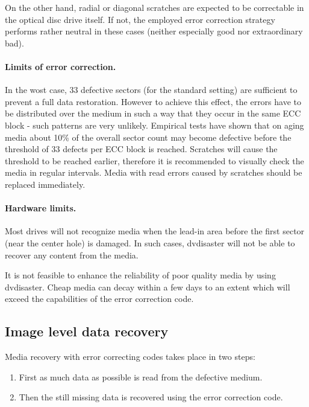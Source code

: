 On the other hand, radial or diagonal scratches are expected to be correctable 
in the optical disc drive itself. If not, the employed error correction 
strategy performs rather neutral in these cases (neither especially good 
nor extraordinary bad).

\paragraph{Limits of error correction.} In the wost case, 33 defective sectors (for the
standard setting) are sufficient to prevent a full data restoration. However 
to achieve this effect, the errors have to be distributed over the medium in such 
a way that they occur in the same ECC block - such patterns are very unlikely.
Empirical tests have shown that on aging media about 10\% of the overall 
sector count may become defective before the threshold of 33 defects per ECC block is reached.
Scratches will cause the threshold to be reached earlier, therefore it is 
recommended to visually check the media in regular intervals. Media with read errors 
caused by scratches should be replaced immediately.

\paragraph{Hardware limits.}  Most drives will not recognize media when the 
lead-in area before the first sector (near the center hole) is damaged. 
In such cases, dvdisaster will not be able to recover any content from the media.

It is not feasible to enhance the reliability of poor quality media by using 
dvdisaster. Cheap media can decay within a few days to an extent which will 
exceed the capabilities of the error correction code. 

\subsection{Image level data recovery}
\label{background-image-level}

Media recovery with error correcting codes takes place in two steps:

\begin{enumerate}
\item First as much data as possible is read from the defective medium.
\item Then the still missing data is recovered using the error correction code.
\end{enumerate}

